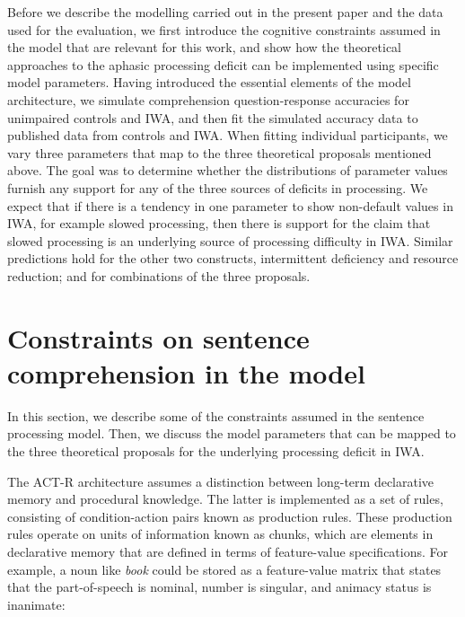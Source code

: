 \documentclass[10pt,letterpaper]{article}
\begin{document}
Before we describe the modelling carried out in the present paper and the data used for the evaluation, 
we first introduce the cognitive constraints assumed in the  model that are relevant for this work, and show how the theoretical approaches to the aphasic processing deficit can be implemented using specific model parameters. 
Having introduced the essential elements of the model architecture, 
we simulate comprehension question-response accuracies for unimpaired controls and IWA, and then fit the simulated accuracy data to published data
\cite{CaplanEtAl2015} from controls and IWA. When fitting individual participants, we vary three parameters that map to the three theoretical proposals mentioned above. The goal was to determine whether the distributions of parameter values furnish any support for any of the three sources of deficits in processing. 
We expect that if there is a tendency in one parameter to show non-default values in IWA, for example slowed processing,
then there is support for the claim that slowed processing is an underlying source of processing difficulty in IWA. Similar predictions hold for the other two constructs, intermittent deficiency and resource reduction; and for combinations of the three proposals.

\section{Constraints on sentence comprehension in the \protect{} model}

In this section, we describe some of the constraints assumed in the  sentence processing model. Then, we discuss the model parameters that can be mapped to the three theoretical proposals for the underlying processing deficit in IWA.

The ACT-R architecture assumes a distinction between long-term declarative memory and procedural knowledge. The latter is implemented as a set of rules, consisting of condition-action pairs known as production rules. These production rules operate on units of information known as chunks, which are elements in declarative memory that are defined in terms of feature-value specifications. For example, a noun like \textit{book} could be stored as a feature-value matrix that states that the part-of-speech is nominal, number is singular, and animacy status is inanimate:
\end{document}

